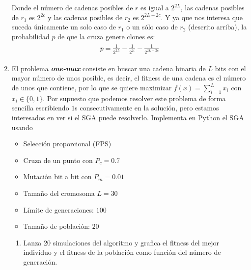 \documentclass[10pt,letterpaper]{article}
\begin{document}
\begin{enumerate}
        Donde el número de cadenas posibles de $r$ es igual a $2^{2L}$, las cadenas posibles de $r_1$ es $2^{2c}$
        y las cadenas posibles de $r_2$ es $2^{2L-2c}$. Y ya que nos interesa que suceda únicamente un
        solo caso de $r_1$ o un sólo caso de $r_2$ (descrito arriba), la probabilidad $p$ de
        que la cruza genere clones es:
            \begin{equation*}\begin{split} \begin{gathered}
                p = \frac{1}{2^{2L}} - \frac{1}{2^{2c}} - \frac{1}{2^{2L-2c}}
            \end{gathered} \end{split} \end{equation*}
    \clearpage
    \item El problema \textit{\textbf{one-max}} consiste en buscar una cadena binaria de $L$
          bits con el mayor número de unos posible, es decir, el fitness de una cadena es el
          número de unos que contiene, por lo que se quiere maximizar $f(x) = \sum_{i=1}^{L} x_i$
          con $x_i \in \{0, 1\}$. Por supuesto que podemos resolver este problema de forma sencilla
          escribiendo $1$s consecutivamente en la solución, pero estamos interesados en ver si
          el SGA puede resolverlo. Implementa en Python el SGA usando
        \begin{itemize}
            \item Selección proporcional (FPS)
            \item Cruza de un punto con $P_c = 0.7$
            \item Mutación bit a bit con $P_m = 0.01$
            \item Tamaño del cromosoma $L= 30$
            \item Límite de generaciones: $100$
            \item Tamaño de población: $20$
        \end{itemize}
        \begin{enumerate}
            \item Lanza 20 simulaciones del algoritmo y grafica el fitness del mejor
                  individuo y el fitness de la población como función del número de
                  generación.
        \end{enumerate}
        \begin{multicols}{2}

\end{multicols}
\end{enumerate}
\end{document}
